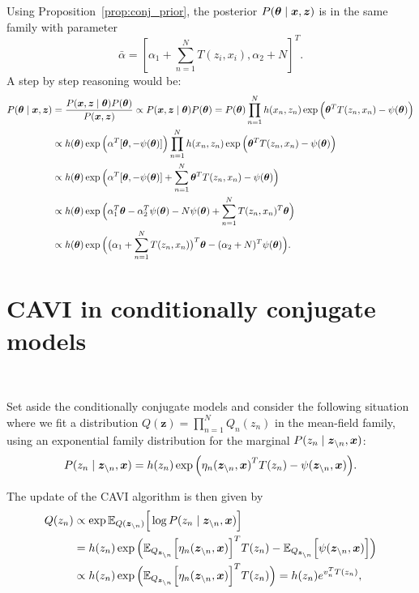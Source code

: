 Using Proposition~\ref{prop:conj_prior}, the posterior \(P(\bm{\theta} \mid \bm{x}, \bm{z})\) is in the same family with parameter
\[
  \bar{\alpha} = {[\alpha_{1} + \sum_{n=1}^{N} T(z_{i}, x_{i}), \alpha_{2}+ N]}^{T}.
\]
A step by step reasoning would be:
\[
  \begin{aligned}
    P(\bm{\theta} \mid \bm{x}, \bm{z}) &= \frac{P(\bm{x}, \bm{z} \mid \bm{\theta}) P(\bm{\theta})}{P(\bm{x}, \bm{z})} \propto  P(\bm{x}, \bm{z} \mid \bm{\theta}) P(\bm{\theta}) = P(\bm{\theta}) \prod_{n=1}^{N}h(x_{n}, z_{n})\exp \Big( \bm{\theta}^{T}T(z_{n}, x_{n})  - \psi(\bm{\theta}) \Big)\\
    &\propto  h(\bm{\theta}) \exp \Big( \alpha^{T}[\bm{\theta}, -\psi(\bm{\theta})]\Big)  \prod_{n=1}^{N}h(x_{n}, z_{n})\exp \Big( \bm{\theta}^{T}T(z_{n}, x_{n})  - \psi(\bm{\theta}) \Big)\\
    &\propto h(\bm{\theta}) \exp \Big(   \alpha^{T}[\bm{\theta}, -\psi(\bm{\theta})] + \sum_{n=1}^{N}  \bm{\theta}^{T}T(z_{n}, x_{n})  - \psi(\bm{\theta})  \Big)\\
    &\propto h(\bm{\theta}) \exp \Big(   \alpha_{1}^{T}\bm{\theta}  - \alpha_{2}^{T}\psi(\bm{\theta}) - N\psi(\bm{\theta}) + \sum_{n=1}^{N}  T(z_{n}, x_{n})^{T}\bm{\theta}  \Big)\\
    &\propto h(\bm{\theta}) \exp \Big(   \big(\alpha_{1} + \sum_{n=1}^{N}  T(z_{n}, x_{n})\big)^{T} \bm{\theta}  - (\alpha_{2} + N)^{T}\psi(\bm{\theta}) \Big).
  \end{aligned}
\]

\section{CAVI in conditionally conjugate models}~\label{sec:cavi_ccm}

Set aside the conditionally conjugate models and consider the following situation where we fit a distribution \(Q(\bm{z}) = \prod_{n=1}^{N} Q_{n}(z_{n})\) in the mean-field family, using an exponential family distribution for the marginal \(P(z_{n} \mid \bm{z}_{\backslash n}, \bm{x})\):
\[
  P(z_{n} \mid \bm{z}_{\backslash n}, \bm{x}) = h(z_{n})\exp \Big( {\eta_{n}(\bm{z}_{\backslash n}, \bm{x})}^{T}T(z_{n}) - \psi(\bm{z}_{\backslash n}, \bm{x}) \Big).
\]

The update of the CAVI algorithm  is then given by
  \begin{align}
    Q(z_{n}) &\propto \exp{\mathbb{E}_{Q(\bm{z}_{\backslash n})}\Big[\log P(z_{n} \mid \bm{z}_{\backslash n}, \bm{x})\Big]} \nonumber\\
    &= h(z_{n})\exp \Big(\mathbb{E}_{Q_{\bm{z}_{\backslash n}}}\Big[ {\eta_{n}(\bm{z}_{\backslash n}, \bm{x})}\Big]^{T}T(z_{n}) - \mathbb{E}_{Q_{\bm{z}_{\backslash n}}}\Big[ \psi(\bm{z}_{\backslash n}, \bm{x})\Big]\Big) \nonumber \\
    &\propto  h(z_{n})\exp \Big(\mathbb{E}_{Q_{\bm{z}_{\backslash n}}}\Big[ {\eta_{n}(\bm{z}_{\backslash n}, \bm{x})}\Big]^{T}T(z_{n})\Big) = h(z_{n})e^{v_{n}^{T}T(z_{n}) }, \label{eq:exponential_update}
  \end{align}

